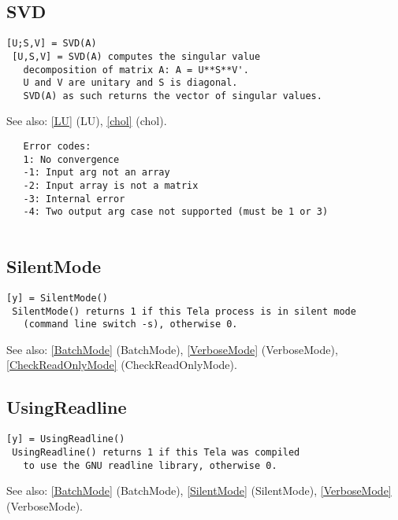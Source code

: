 \documentclass[a4paper]{article}
\begin{document}
\subsection{SVD\label{SVD}}

\begin{tscreen}
\begin{verbatim}
[U;S,V] = SVD(A)
 [U,S,V] = SVD(A) computes the singular value
   decomposition of matrix A: A = U**S**V'.
   U and V are unitary and S is diagonal.
   SVD(A) as such returns the vector of singular values.
\end{verbatim}

See also: \ref{LU} {(LU)}, \ref{chol} {(chol)}.
\begin{verbatim}
   Error codes:
   1: No convergence
   -1: Input arg not an array
   -2: Input array is not a matrix
   -3: Internal error
   -4: Two output arg case not supported (must be 1 or 3)
   
\end{verbatim}
\end{tscreen}





\subsection{SilentMode\label{SilentMode}}

\begin{tscreen}
\begin{verbatim}
[y] = SilentMode()
 SilentMode() returns 1 if this Tela process is in silent mode
   (command line switch -s), otherwise 0.
\end{verbatim}

See also: \ref{BatchMode} {(BatchMode)}, \ref{VerboseMode} {(VerboseMode)}, \ref{CheckReadOnlyMode} {(CheckReadOnlyMode)}.
\end{tscreen}





\subsection{UsingReadline\label{UsingReadline}}

\begin{tscreen}
\begin{verbatim}
[y] = UsingReadline()
 UsingReadline() returns 1 if this Tela was compiled
   to use the GNU readline library, otherwise 0.
\end{verbatim}

See also: \ref{BatchMode} {(BatchMode)}, \ref{SilentMode} {(SilentMode)}, \ref{VerboseMode} {(VerboseMode)}.
\end{tscreen}
\end{document}
